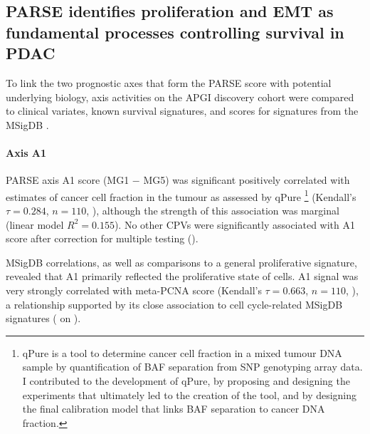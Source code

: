 \documentclass[dissertation.tex]{subfiles}
\begin{document}
\begin{figure}[!h]
\end{figure}


\subsection{\acrshort{PARSE} identifies proliferation and \acrshort{EMT} as fundamental processes controlling survival in \acrshort{PDAC}}
To link the two prognostic axes that form the \gls{PARSE} score with potential underlying biology, axis activities on the \gls{APGI} discovery cohort were compared to clinical variates, known survival signatures, and scores for signatures from the \gls{MSigDB} \cite{Subramanian2005}.

\paragraph{Axis A1}
\gls{PARSE} axis A1 score (MG1 $-$ MG5) was significant positively correlated with estimates of cancer cell fraction in the tumour as assessed by qPure \cite{Song2012} \footnote{qPure is a tool to determine cancer cell fraction in a mixed tumour DNA sample by quantification of \gls{BAF} separation from \gls{SNP} genotyping array data.  I contributed to the development of qPure, by proposing and designing the experiments that ultimately led to the creation of the tool, and by designing the final calibration model that links \gls{BAF} separation to cancer DNA fraction.} (Kendall's $\tau = 0.284$, $n = 110$, ), although the strength of this association was marginal (linear model $R^2 = 0.155$).  No other \glspl{CPV} were significantly associated with A1 score after correction for multiple testing ().

\gls{MSigDB} correlations, as well as comparisons to a general proliferative signature, revealed that A1 primarily reflected the proliferative state of cells.  A1 signal was very strongly correlated with meta-PCNA \cite{Venet2011} score (Kendall's $\tau = 0.663$, $n = 110$, ), a relationship supported by its close association to cell cycle-related \gls{MSigDB} signatures ( on ).
\end{document}
